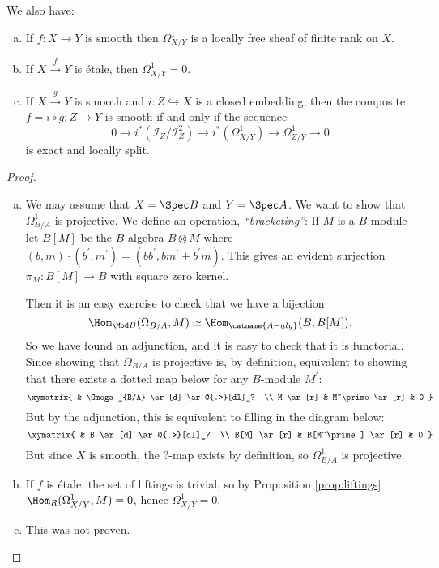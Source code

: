 \documentclass[11pt, english]{article}
\begin{document}
We also have:
\begin{prop}
\begin{enumerate}[a)]
\item
If $f:X \to Y$ is smooth then $\Omega_{X/Y}^1$ is a locally free sheaf of finite rank on $X$.
\item
If $X \xrightarrow f Y$ is étale, then $\Omega_{X/Y}^1= 0$. 
\item
If $X \xrightarrow g Y$ is smooth and $i:Z \hookrightarrow X$ is a closed embedding, then the composite $f = i \circ g: Z \to Y$ is smooth if and only if the sequence
\[
0 \to i^\ast(\mathcal I_Z/\mathcal I^2_Z) \to i^*(\Omega_{X/Y}^1) \to \Omega_{Z/Y}^1 \to 0
\]
is exact and locally split.
\end{enumerate}
\end{prop}
\begin{proof}

\begin{enumerate}[a)]
\item We may assume that $X = \Spec B$ and $Y= \Spec A$. We want to show that $\Omega_{B/A}^1$ is projective. We define an operation, \emph{``bracketing''}: If $M$ is a $B$-module let $B[M]$ be the $B$-algebra $B \otimes M$ where $(b,m) \cdot (b^\prime,m^\prime) = (bb^\prime,bm^\prime+b^\prime m)$. This gives an evident surjection $\pi_M:B[M] \to B$ with square zero kernel.

Then it is an easy exercise to check that we have a bijection \[ \Hom_{\Mod B}(\Omega_{B/A},M) \simeq \Hom_{\catname{A-alg}}(B,B[M]).\] So we have found an adjunction, and it is easy to check that it is functorial. Since showing that $\Omega_{B/A}$ is projective is, by definition, equivalent to showing that there exists a dotted map below for any $B$-module $M^\prime$:
\[
\xymatrix{
 & \Omega_{B/A} \ar[d] \ar@{.>}[dl]_?  \\
M \ar[r] & M^\prime \ar[r] & 0
}
\]
But by the adjunction, this is equivalent to filling in the diagram below:
\[
\xymatrix{
 & B \ar[d] \ar@{.>}[dl]_? \\
B[M] \ar[r] & B[M^\prime]  \ar[r] & 0
}
\]
But since $X$ is smooth, the $?$-map exists by definition, so $\Omega_{B/A}^1$ is projective.

\item If $f$ is étale, the set of liftings is trivial, so by Proposition \ref{prop:liftings} $\Hom_{R}(\Omega_{X/Y}^1,M)=0$, hence $\Omega_{X/Y}^1=0$.

\item This was not proven.
\end{enumerate}
\end{proof}
\end{document}
